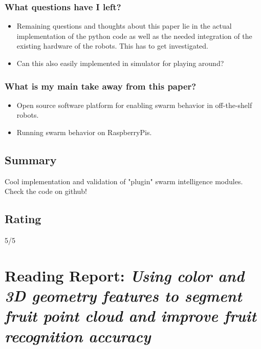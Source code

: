     \subsubsection*{What questions have I left?}
    \begin{itemize}
        \item Remaining questions and thoughts about this paper lie in the actual implementation of the python code as well as the needed integration of the existing hardware of the robots. This has to get investigated.
        \item Can this also easily implemented in simulator for playing around?
    \end{itemize}
    \subsubsection*{What is my main take away from this paper?}
    \begin{itemize}
        \item Open source software platform for enabling swarm behavior in off-the-shelf robots.
        \item Running swarm behavior on RaspberryPis.
    \end{itemize}
    
    \subsection*{Summary}
    Cool implementation and validation of "plugin" swarm intelligence modules. Check the code on github!
    \subsection*{Rating}
    5/5
    
    \newpage
    \section{Reading Report: \emph{Using color and 3D geometry features to segment fruit point cloud and improve fruit recognition accuracy}}
    \cite{Wu2020}
    
